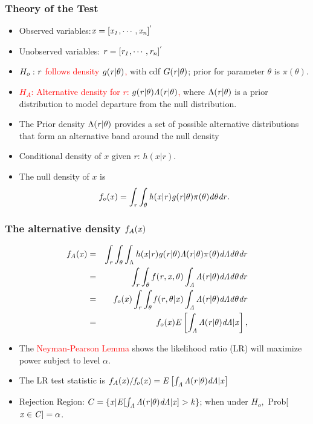 \documentclass{beamer}
\begin{document}
 \frame
{
  \frametitle{Theory of the Test}
\begin{itemize}
\item 
Observed variables:$\it{x} = [x_1,\cdots, x_n]^{'}$
\item
Unobserved variables: $\it{r} =[r_1,\cdots,r_n]^{'}$ 
\item
\textcolor{red}{$H_o: \it{r}$ follows 
density $g(\it{r}| \theta)$,} with cdf
$G(\it{r}| \theta)$;
prior for parameter $\theta$ is $\pi(\theta)$.

\item
 \textcolor{red}{$H_A$: 
 Alternative density for $r$:
 $g(\it{r}| \theta) \Lambda(\it{r}| \theta)$,}
 where $\Lambda(\it{r}| \theta)$ is a prior distribution to 
  model departure  from the null distribution.

\item  The Prior density $\Lambda(\it{r}| \theta)$ provides a set of possible alternative
distributions that form an alternative band around the null density
\item
Conditional density 
   of $x$ given $r$: 
$h(x|r)$. 
\item 
 The null density of $x$ is 
  \begin{equation*}
  f_o(\it{x}) = \int_{\it{r}} \int_{\theta} 
  h(\it{x}|\it{r})g(\it{r}| \theta)\pi(\theta) 
  d\theta d\it{r}.
  \end{equation*}
\end{itemize}
}


 \frame
{
  \frametitle{ The alternative density $f_A(\it{x})$}
 \begin{eqnarray}
  f_A(\it{x})  
  &=& \int_{\it{r}} 
  \int_{\theta} \int_{\Lambda}
  h(\it{x}|\it{r})g(\it{r}| \theta)
  \Lambda(\it{r}| \theta)\pi(\theta) 
  d\Lambda d\theta d\it{r}\nonumber \\
   &=&  \int_{\it{r}} \int_{\theta} 
   f(\it{r}, \it{x}, \theta) 
  \int_{\Lambda}\Lambda(\it{r}| \theta)
  d\Lambda d\theta d\it{r} \nonumber \\
 &=&  f_o(\it{x})  \int_{\it{r}} 
 \int_{\theta} f(\it{r}, \theta| \it{x}) 
 \int_{\Lambda} \Lambda(\it{r}| \theta)
 d\Lambda d\theta d\it{r} \nonumber \\
  &=&  f_o(\it{x})  
  E \left[\int_{\Lambda}\Lambda(\it{r}| \theta)
   d\Lambda|\it{x}\right], \nonumber
\end{eqnarray}

\begin{itemize}
\item The \textcolor{red}{Neyman-Pearson Lemma} 
shows the  likelihood ratio (LR) will maximize power 
subject to level 
$\alpha$.

\item
The LR test statistic is 
$ f_A(\it{x})/ f_o(\it{x})= 
 E\left[\int_{\Lambda}\Lambda(\it{r}| \theta) d\Lambda|\it{x}\right]$
 
\item
Rejection Region:
$C= \{\it{x} | E[\int_{\Lambda}
\Lambda(\it{r}| \theta)d\Lambda |\it{x}] > k\}$;
when under ${H_o},$
Prob[$ \it{x} \in C]=\alpha$.
\end{itemize}
}
\end{document}
